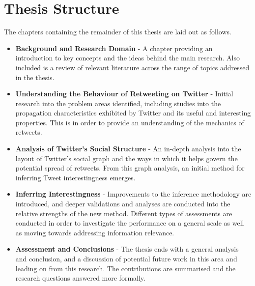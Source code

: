 \section{Thesis Structure}
The chapters containing the remainder of this thesis are laid out as follows.

\begin{itemize}
    \item \textbf{Background and Research Domain} - A chapter providing an introduction to key concepts and the ideas behind the main research. Also included is a review of relevant literature across the range of topics addressed in the thesis.
    \item \textbf{Understanding the Behaviour of Retweeting on Twitter} - Initial research into the problem areas identified, including studies into the propagation characteristics exhibited by Twitter and its useful and interesting properties. This is in order to provide an understanding of the mechanics of retweets.
    \item \textbf{Analysis of Twitter's Social Structure} - An in-depth analysis into the layout of Twitter's social graph and the ways in which it helps govern the potential spread of retweets. From this graph analysis, an initial method for inferring Tweet interestingness emerges.
    \item \textbf{Inferring Interestingness} - Improvements to the inference methodology are introduced, and deeper validations and analyses are conducted into the relative strengths of the new method. Different types of assessments are conducted in order to investigate the performance on a general scale as well as moving towards addressing information relevance.
    \item \textbf{Assessment and Conclusions} - The thesis ends with a general analysis and conclusion, and a discussion of potential future work in this area and leading on from this research. The contributions are summarised and the research questions answered more formally.
\end{itemize}
